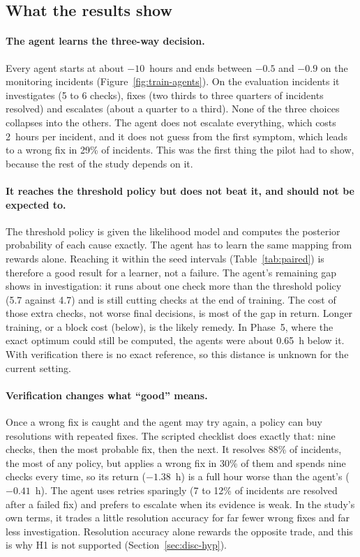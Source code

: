 \documentclass[11pt,a4paper]{article}
\begin{document}
\subsection{What the results show}

\paragraph{The agent learns the three-way decision.} Every agent starts at about $-10$~hours and ends between $-0.5$ and $-0.9$ on the monitoring incidents (Figure~\ref{fig:train-agents}). On the evaluation incidents it investigates (5 to 6 checks), fixes (two thirds to three quarters of incidents resolved) and escalates (about a quarter to a third). None of the three choices collapses into the others. The agent does not escalate everything, which costs 2~hours per incident, and it does not guess from the first symptom, which leads to a wrong fix in 29\% of incidents. This was the first thing the pilot had to show, because the rest of the study depends on it.

\paragraph{It reaches the threshold policy but does not beat it, and should not be expected to.} The threshold policy is given the likelihood model and computes the posterior probability of each cause exactly. The agent has to learn the same mapping from rewards alone. Reaching it within the seed intervals (Table~\ref{tab:paired}) is therefore a good result for a learner, not a failure. The agent's remaining gap shows in investigation: it runs about one check more than the threshold policy (5.7 against 4.7) and is still cutting checks at the end of training. The cost of those extra checks, not worse final decisions, is most of the gap in return. Longer training, or a block cost (below), is the likely remedy. In Phase~5, where the exact optimum could still be computed, the agents were about 0.65~h below it. With verification there is no exact reference, so this distance is unknown for the current setting.

\paragraph{Verification changes what ``good'' means.} Once a wrong fix is caught and the agent may try again, a policy can buy resolutions with repeated fixes. The scripted checklist does exactly that: nine checks, then the most probable fix, then the next. It resolves 88\% of incidents, the most of any policy, but applies a wrong fix in 30\% of them and spends nine checks every time, so its return ($-1.38$~h) is a full hour worse than the agent's ($-0.41$~h). The agent uses retries sparingly (7 to 12\% of incidents are resolved after a failed fix) and prefers to escalate when its evidence is weak. In the study's own terms, it trades a little resolution accuracy for far fewer wrong fixes and far less investigation. Resolution accuracy alone rewards the opposite trade, and this is why H1 is not supported (Section~\ref{sec:disc-hyp}).
\end{document}
